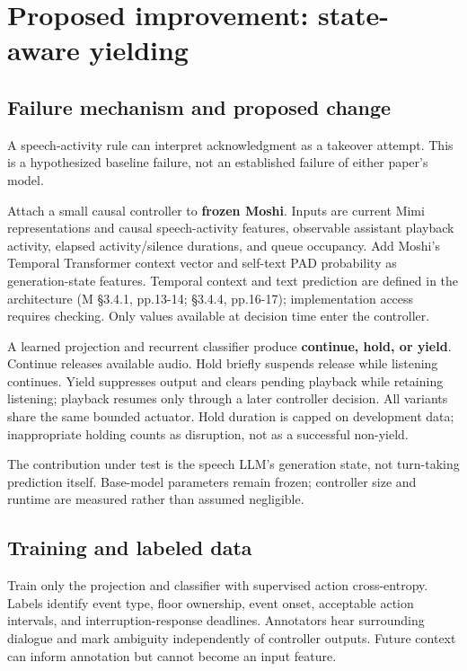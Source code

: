 \documentclass[11pt]{article}
\begin{document}
\newpage
\section{Proposed improvement: state-aware yielding}

\subsection{Failure mechanism and proposed change}

A speech-activity rule can interpret acknowledgment as a takeover attempt. This is a hypothesized baseline failure, not an established failure of either paper's model.

Attach a small causal controller to \textbf{frozen Moshi}. Inputs are current Mimi representations and causal speech-activity features, observable assistant playback activity, elapsed activity/silence durations, and queue occupancy. Add Moshi's Temporal Transformer context vector and self-text PAD probability as generation-state features. Temporal context and text prediction are defined in the architecture (M §3.4.1, pp.13-14; §3.4.4, pp.16-17); implementation access requires checking. Only values available at decision time enter the controller.

A learned projection and recurrent classifier produce \textbf{continue, hold, or yield}. Continue releases available audio. Hold briefly suspends release while listening continues. Yield suppresses output and clears pending playback while retaining listening; playback resumes only through a later controller decision. All variants share the same bounded actuator. Hold duration is capped on development data; inappropriate holding counts as disruption, not as a successful non-yield.

The contribution under test is the speech LLM's generation state, not turn-taking prediction itself. Base-model parameters remain frozen; controller size and runtime are measured rather than assumed negligible.

\subsection{Training and labeled data}

Train only the projection and classifier with supervised action cross-entropy. Labels identify event type, floor ownership, event onset, acceptable action intervals, and interruption-response deadlines. Annotators hear surrounding dialogue and mark ambiguity independently of controller outputs. Future context can inform annotation but cannot become an input feature.
\end{document}
